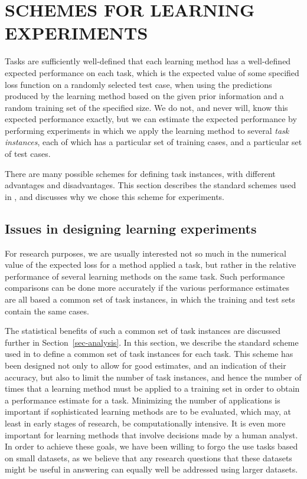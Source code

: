 %
%
\newpage

\section{SCHEMES FOR LEARNING EXPERIMENTS}\label{sec-scheme}
\thispagestyle{plain}
\setcounter{figure}{0}

Tasks are sufficiently well-defined that each learning method has a
well-defined expected performance on each task, which is the expected
value of some specified loss function on a randomly selected test
case, when using the predictions produced by the learning method based
on the given prior information and a random training set of the
specified size.  We do not, and never will, know this expected
performance exactly, but we can estimate the expected performance by
performing experiments in which we apply the learning method to
several {\em task instances}, each of which has a particular set of
training cases, and a particular set of test cases.

There are many possible schemes for defining task instances, with
different advantages and disadvantages.  This section describes the
standard schemes used in \delve{}, and discusses why we chose this
scheme for experiments.


\subsection{Issues in designing learning experiments}\label{scheme-issues}

For research purposes, we are usually interested not so much in the
numerical value of the expected loss for a method applied a task, but
rather in the relative performance of several learning methods on the
same task.  Such performance comparisons can be done more accurately
if the various performance estimates are all based a common set of
task instances, in which the training and test sets contain the same
cases.

The statistical benefits of such a common set of task instances are
discussed further in Section~\ref{sec-analysis}.  In this section, we
describe the standard scheme used in \delve{} to define a common set
of task instances for each task.  This scheme has been designed not
only to allow for good estimates, and an indication of their accuracy,
but also to limit the number of task instances, and hence the number
of times that a learning method must be applied to a training set in
order to obtain a performance estimate for a task.  Minimizing the
number of applications is important if sophisticated learning methods
are to be evaluated, which may, at least in early stages of research,
be computationally intensive.  It is even more important for learning
methods that involve decisions made by a human analyst.  In order to
achieve these goals, we have been willing to forgo the use tasks based
on small datasets, as we believe that any research questions that
these datasets might be useful in answering can equally well be
addressed using larger datasets.

